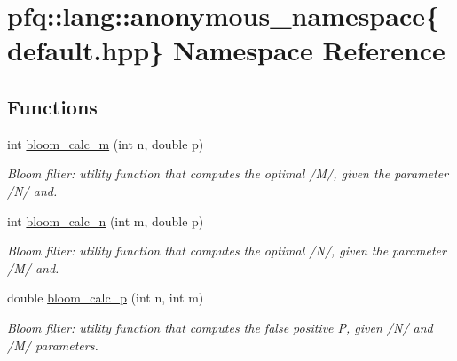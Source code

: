 \hypertarget{namespacepfq_1_1lang_1_1anonymous__namespace_02default_8hpp_03}{\section{pfq\+:\+:lang\+:\+:anonymous\+\_\+namespace\{default.\+hpp\} Namespace Reference}
\label{namespacepfq_1_1lang_1_1anonymous__namespace_02default_8hpp_03}
}
\subsection*{Functions}
\begin{DoxyCompactItemize}
\item 
int \hyperlink{namespacepfq_1_1lang_1_1anonymous__namespace_02default_8hpp_03_a69262c3acb476a85eb29e16540ae3f08}{bloom\+\_\+calc\+\_\+m} (int n, double p)
\begin{DoxyCompactList}\small\item\em Bloom filter\+: utility function that computes the optimal /\+M/, given the parameter /\+N/ and. \end{DoxyCompactList}\item 
int \hyperlink{namespacepfq_1_1lang_1_1anonymous__namespace_02default_8hpp_03_a2385e61b93ec1d91ce7117fe787bae7e}{bloom\+\_\+calc\+\_\+n} (int m, double p)
\begin{DoxyCompactList}\small\item\em Bloom filter\+: utility function that computes the optimal /\+N/, given the parameter /\+M/ and. \end{DoxyCompactList}\item 
double \hyperlink{namespacepfq_1_1lang_1_1anonymous__namespace_02default_8hpp_03_a8d0641a00fb27e53db78af7572b1b3a6}{bloom\+\_\+calc\+\_\+p} (int n, int m)
\begin{DoxyCompactList}\small\item\em Bloom filter\+: utility function that computes the false positive P, given /\+N/ and /\+M/ parameters. \end{DoxyCompactList}\end{DoxyCompactItemize}
